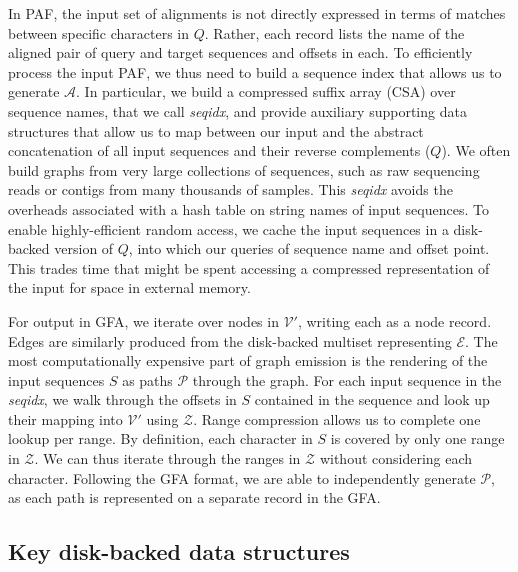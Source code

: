 \documentclass{bioinfo}
\theoremstyle{definition}
\begin{document}
In PAF, the input set of alignments is not directly expressed in terms of matches between specific characters in $Q$.
Rather, each record lists the name of the aligned pair of query and target sequences and offsets in each.
To efficiently process the input PAF, we thus need to build a sequence index that allows us to generate $\mathcal{A}$.
In particular, we build a compressed suffix array (CSA) \citep{Sadakane_2000} over sequence names, that we call \textit{seqidx}, and provide auxiliary supporting data structures that allow us to map between our input and the abstract concatenation of all input sequences and their reverse complements ($Q$).
We often build graphs from very large collections of sequences, such as raw sequencing reads or contigs from many thousands of samples.
This \textit{seqidx} avoids the overheads associated with a hash table on string names of input sequences.
To enable highly-efficient random access, we cache the input sequences in a disk-backed version of $Q$, into which our queries of sequence name and offset point.
This trades time that might be spent accessing a compressed representation of the input for space in external memory.

For output in GFA, we iterate over nodes in $\mathcal{V}'$, writing each as a node record.
Edges are similarly produced from the disk-backed multiset representing $\mathcal{E}$.
The most computationally expensive part of graph emission is the rendering of the input sequences $S$ as paths $\mathcal{P}$ through the graph.
For each input sequence in the \textit{seqidx}, we walk through the offsets in $S$ contained in the sequence and look up their mapping into $\mathcal{V}'$ using $\mathcal{Z}$.
Range compression allows us to complete one lookup per range.
By definition, each character in $S$ is covered by only one range in $\mathcal{Z}$.
We can thus iterate through the ranges in $\mathcal{Z}$ without considering each character.
Following the GFA format, we are able to independently generate $\mathcal{P}$, as each path is represented on a separate record in the GFA.

\subsection{Key disk-backed data structures}
\end{document}

